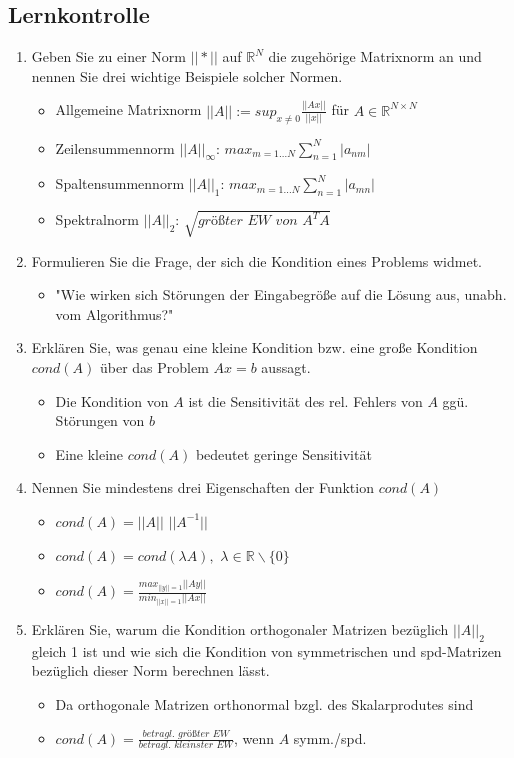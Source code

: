 \documentclass[]{article}
\begin{document}
\subsection{Lernkontrolle}
	\begin{enumerate}
		\item Geben Sie zu einer Norm $|| * ||$ auf $\mathbb{R}^N$ die zugehörige Matrixnorm an und nennen Sie drei wichtige Beispiele solcher Normen.
			\begin{itemize}
				\item Allgemeine Matrixnorm $||A|| := sup_{x \neq 0} \frac{||Ax||}{||x||}$ für $A \in \mathbb{R}^{N \times N}$
				\item Zeilensummennorm $||A||_\infty$: $max_{m=1 \dots N} \sum_{n=1}^{N}|a_{nm}|$
				\item Spaltensummennorm $||A||_1$: $max_{m=1 \dots N} \sum_{n=1}^{N}|a_{mn}|$
				\item Spektralnorm $||A||_2$: $\sqrt{\textit{größter EW von }A^T A}$
			\end{itemize}
		\item Formulieren Sie die Frage, der sich die Kondition eines Problems widmet.
			\begin{itemize}
				\item "Wie wirken sich Störungen der Eingabegröße auf die Lösung aus, unabh. vom Algorithmus?"
			\end{itemize}
		\item Erklären Sie, was genau eine kleine Kondition bzw. eine große Kondition $cond(A)$ über das Problem $Ax=b$ aussagt.
			\begin{itemize}
				\item Die Kondition von $A$ ist die Sensitivität des rel. Fehlers von $A$ ggü. Störungen von $b$
				\item Eine kleine $cond(A)$ bedeutet geringe Sensitivität
			\end{itemize}
		\item Nennen Sie mindestens drei Eigenschaften der Funktion $cond(A)$
			\begin{itemize}
				\item $cond(A) = ||A||$ $||A^{-1}||$
				\item $cond(A) = cond(\lambda A),$ \quad $\lambda \in \mathbb{R} \backslash \{0\}$
				\item $cond(A) = \frac{max_{||y||=1}  ||Ay||}{min_{||x||=1} ||Ax||}$
			\end{itemize}
		\item Erklären Sie, warum die Kondition orthogonaler Matrizen bezüglich $||A||_2$ gleich 1 ist und wie sich die Kondition von symmetrischen und spd-Matrizen bezüglich dieser Norm berechnen lässt.  
			\begin{itemize}
				\item Da orthogonale Matrizen orthonormal bzgl. des Skalarprodutes sind
				\item $cond(A) = \frac{\textit{betragl. größter EW}}{\textit{betragl. kleinster EW}}$, wenn $A$ symm./spd.
			\end{itemize}
	\end{enumerate}
\end{document}
